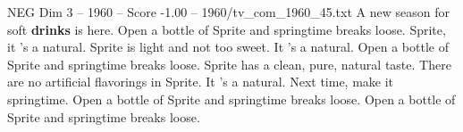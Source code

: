 \begin{textsample}{NEG Dim 3 – 1960 – Score -1.00 – 1960/tv\_com\_1960\_45.txt}  \label{ex:f3_neg_077}
A new season for soft \textbf{drinks} is here.
Open a bottle of Sprite and springtime breaks loose.
Sprite, it 's a natural.
Sprite is light and not too sweet.
It 's a natural.
Open a bottle of Sprite and springtime breaks loose.
Sprite has a clean, pure, natural taste.
There are no artificial flavorings in Sprite.
It 's a natural.
Next time, make it springtime.
Open a bottle of Sprite and springtime breaks loose.
Open a bottle of Sprite and springtime breaks loose.

\end{textsample}
